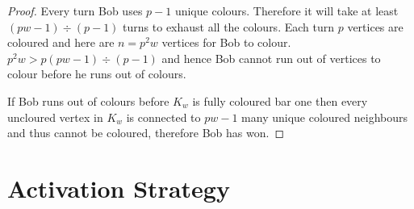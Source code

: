 \begin{proof}
Every turn Bob uses $p-1$ unique colours. Therefore it will take at least $(pw-1)\div(p-1)$ turns to exhaust all the colours. Each turn $p$ vertices are coloured and here are $n=p^2w$ vertices for Bob to colour. $p^2w > p(pw-1)\div(p-1)$ and hence Bob cannot run out of vertices to colour before he runs out of colours.

If Bob runs out of colours before $K_w$ is fully coloured bar one then every uncloured vertex in $K_w$ is connected to $pw-1$ many unique coloured neighbours and thus cannot be coloured, therefore Bob has won.

\end{proof}

%
%    
%    
%       
%       
%    
%    
%
%
%       
%    
%    

\section{Activation Strategy}
